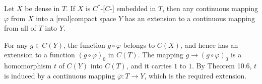 Let $X$ be dense in $T$.
If $X$ is $C^*$-[$C$-] embedded in $T$,
then any continuous mapping $\varphi$ from $X$
into a [real]compact space $Y$ has an extension
to a continuous mapping from all of $T$ into $Y$.

For any $g \in C(Y)$, the function $g \circ \varphi$ belongs to $C(X)$,
and hence has an extension to a function $(g \circ \varphi)_0$ in $C(T)$.
The mapping $g \rightarrow (g \circ \varphi)_0$ is a homomorphism $t$
of $C(Y)$ into $C(T)$, and it carries $1$ to $1$.
By Theorem 10.6, $t$ is induced by a continuous mapping
$\overline{\varphi}: T \rightarrow Y$, which is the required extension.
